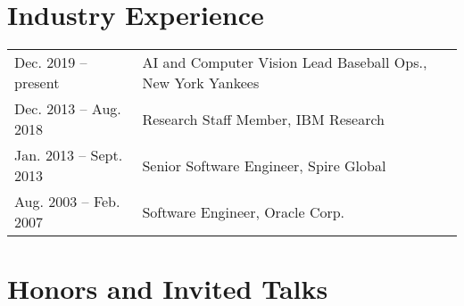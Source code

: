 \documentclass[12pt]{article}
\begin{document}
\section{Industry Experience}

\begin{tabular}{l l}
Dec. 2019 -- present & AI and Computer Vision Lead Baseball Ops., New York Yankees \\
Dec. 2013 -- Aug. 2018 & Research Staff Member, IBM Research \\
Jan. 2013 -- Sept. 2013 & Senior Software Engineer, Spire Global \\
Aug. 2003 -- Feb. 2007 & Software Engineer, Oracle Corp. \\
\end{tabular}

\section{Honors and Invited Talks}
\end{document}
